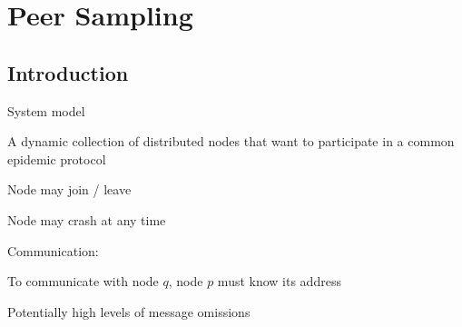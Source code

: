 
\FrameContent

\section{Peer Sampling}

\subsection{Introduction}

\begin{frame}{System model}

\transdissolve

\BIL
\item A dynamic collection of distributed nodes that want to participate in a common epidemic protocol
\BI
\item Node may join / leave
\item Node may crash at any time
\EI
\item Communication:
\BI
\item To communicate with node $q$, node $p$ must know its address
\item Potentially high levels of message omissions
\EI
\EIL

\end{frame}


